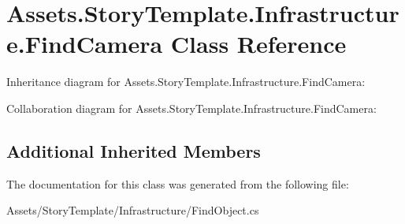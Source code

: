\hypertarget{classAssets_1_1StoryTemplate_1_1Infrastructure_1_1FindCamera}{}\section{Assets.\+Story\+Template.\+Infrastructure.\+Find\+Camera Class Reference}
\label{classAssets_1_1StoryTemplate_1_1Infrastructure_1_1FindCamera}


Inheritance diagram for Assets.\+Story\+Template.\+Infrastructure.\+Find\+Camera\+:


Collaboration diagram for Assets.\+Story\+Template.\+Infrastructure.\+Find\+Camera\+:
\subsection*{Additional Inherited Members}


The documentation for this class was generated from the following file\+:\begin{DoxyCompactItemize}
\item 
Assets/\+Story\+Template/\+Infrastructure/Find\+Object.\+cs\end{DoxyCompactItemize}
